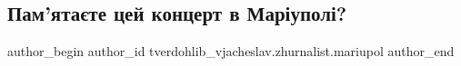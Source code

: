 
 
 
 
 

\subsection{Пам'ятаєте цей концерт в Маріуполі?}
\label{sec:01_02_2023.fb.tverdohlib_vjacheslav.zhurnalist.mariupol.1.pam_yata_te_tsei_kon}

\ifcmt
 author_begin
   author_id tverdohlib_vjacheslav.zhurnalist.mariupol
 author_end
\fi
